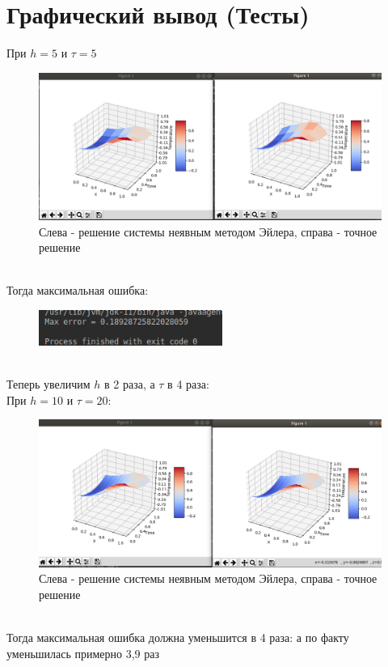 \documentclass[12pt,a4paper]{scrartcl}
\begin{document}
\section{Графический вывод (Тесты)}
При $h = 5$ и $\tau = 5$ 
\begin{figure}[h]
    \centering
    \includegraphics[width=14cm]{t5h5.png}
    \caption{Слева - решение системы неявным методом Эйлера,
                справа - точное решение}
\end{figure}
\\
Тогда максимальная ошибка: 
\begin{figure}[h]
    \centering
    \includegraphics[width=6cm]{error1.PNG}
\end{figure}
\\
Теперь увеличим $h$ в 2 раза, а $\tau$ в 4 раза: \\
При $h = 10$ и $\tau = 20$:
\begin{figure}[h]
    \centering
    \includegraphics[width=14cm]{t20h10.png}
    \caption{Слева - решение системы неявным методом Эйлера,
                справа - точное решение}
\end{figure}
\\
Тогда максимальная ошибка должна уменьшится в 4 раза: а по факту уменьшилась примерно 3,9 раз \\
\end{document}
